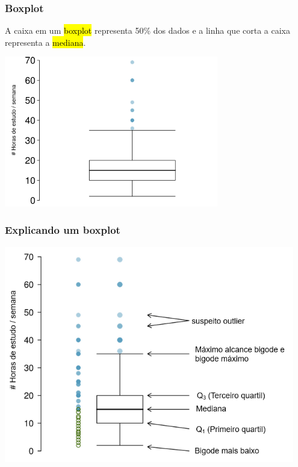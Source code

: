 \begin{frame}
\frametitle{Boxplot}
\justifying
A caixa em um \hl{boxplot} representa 50\% dos dados e a linha que corta a caixa representa a \hl{mediana}.

\begin{center}
\includegraphics[width=0.7\textwidth]{1-6_numerical_data/study_hours_box.png}
\end{center}

\end{frame}


\begin{frame}
\frametitle{Explicando um boxplot}

\begin{center}
\includegraphics[width=0.95\textwidth]{1-6_numerical_data/study_hours_box_layout.png}
\end{center}

\end{frame}

